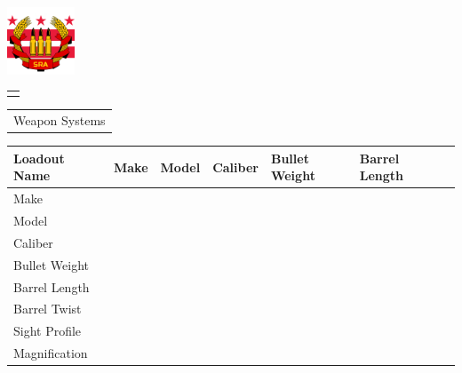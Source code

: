 \documentclass[8pt]{article}
\author{DC Metro Socialist Rifle Association}
\begin{document}
\begin{minipage}[t]{2cm} 
	\includegraphics[width=2cm, height=2cm]{DC.png}
	\begin{tabular}{p{1.5cm}|}
		\\
		\hline
		\\[5.5cm]
	\end{tabular}
\end{minipage}
\hfill
\begin{minipage}[t]{11cm}
	\begin{minipage}[t]{2cm}
		\begin{tabular}{ p{8cm} }			
			\huge Weapon Systems\\[1cm]			
		\end{tabular}
	\end{minipage}
		
	\begin{tabular}{ | p{1.5cm} | p{1cm} | p{1cm} | p{1cm} | p{1cm} | p{1cm} | p{1cm} |}
		\hline
		\tiny Loadout Name & Make & Model & Caliber & Bullet Weight & Barrel Length &  \\ [2mm]
		\hline
		\tiny Make &  &  &  &  &  &  \\ [2mm]
		\hline
		\tiny Model & & & & & & \\ [2mm]
		\hline
		\tiny Caliber & & & & & & \\ [2mm]
		\hline
		\tiny Bullet Weight & & & & & & \\ [2mm]
		\hline
		\tiny Barrel Length & & & & & & \\ [2mm]
		\hline
		\tiny Barrel Twist & & & & & & \\ [2mm]
		\hline
		\tiny Sight Profile & & & & & & \\ [2mm]
		\hline
		\tiny Magnification & & & & & & \\ [2mm]
		\hline
	\end{tabular}
\end{minipage}
\end{document}
